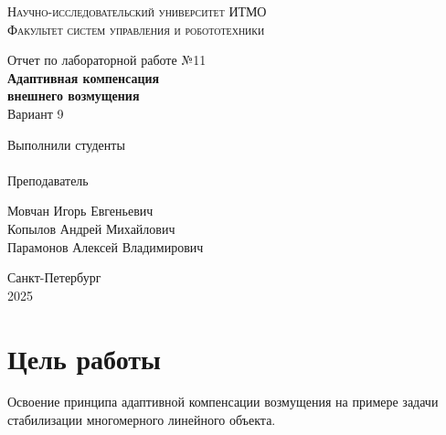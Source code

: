 \documentclass[a4paper,hidelinks,14pt]{extarticle}
\begin{document}
	\begin{titlepage}
		\setlength{\parindent}{0ex}
		
		\begin{center}
			\textsc{
				\vspace{1ex}
                Научно-исследовательский университет ИТМО \\
				\vspace{0.5ex}
				Факультет систем управления и робототехники \\
				\vspace{0.5ex}
			}
		\end{center}
		
		\vspace{40mm}
		
		\begin{center}
			Отчет по лабораторной работе №11\\
			\textbf{Адаптивная компенсация \\
			внешнего возмущения}\\
			Вариант 9
		\end{center}
		
		\vspace{45mm}
		
		\begin{minipage}{.45\linewidth}
			Выполнили студенты
            \\
			\\[5mm]
			Преподаватель
		\end{minipage}
		\hfill
		\begin{minipage}{.52\linewidth}
			\begin{flushright}
				Мовчан Игорь Евгеньевич 
				\\
				Копылов Андрей Михайлович
				\\[5mm]
				Парамонов Алексей Владимирович
			\end{flushright}
		\end{minipage}
		
		\vfill
		\begin{center}
			Санкт-Петербург
			\\
			2025
		\end{center}
		
	\end{titlepage}

	\tableofcontents
	\clearpage
	
	\section{Цель работы}
	Освоение принципа адаптивной компенсации возмущения на примере задачи стабилизации многомерного линейного объекта.
	
\end{document}
